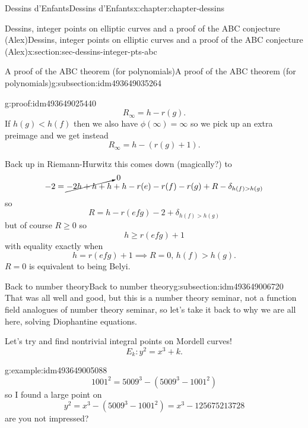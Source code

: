 \documentclass[oneside,10pt,]{book}
\numberwithin{equation}{section}
\newcommand{\lt}{<}
\newcommand{\gt}{>}
\begin{document}
\begin{chapterptx}{Dessins d'Enfants}{}{Dessins d'Enfants}{}{}{x:chapter:chapter-dessins}
\begin{sectionptx}{Dessins, integer points on elliptic curves and a proof of the ABC conjecture (Alex)}{}{Dessins, integer points on elliptic curves and a proof of the ABC conjecture (Alex)}{}{}{x:section:sec-dessins-integer-pts-abc}
\begin{subsectionptx}{A proof of the ABC theorem (for polynomials)}{}{A proof of the ABC theorem (for polynomials)}{}{}{g:subsection:idm493649035264}
\begin{proofptx}{}{g:proof:idm493649025440}
\begin{equation*}
R_\infty = h - r(g)\text{.}
\end{equation*}
If \(h(g) \lt h(f)\) then we also have \(\phi(\infty) = \infty\) so we pick up an extra preimage and we get instead%
\begin{equation*}
R_\infty = h - (r(g) + 1)\text{.}
\end{equation*}
%
\par
Back up in Riemann-Hurwitz this comes down (magically?) to%
\begin{equation*}
-2 = \cancelto{0}{-2 h + h + h} + h - r(e) -r(f) - r(g) + R - \delta_{h(f) \gt h(g)}
\end{equation*}
so%
\begin{equation*}
R = h - r(efg) - 2 + \delta_{h(f) \gt h(g)}
\end{equation*}
but of course \(R \ge 0\) so%
\begin{equation*}
h \ge r(efg) + 1
\end{equation*}
with equality exactly when%
\begin{equation*}
h = r(efg) + 1 \implies R = 0,\, h(f) \gt h(g)\text{.}
\end{equation*}
\(R= 0\) is equivalent to being Belyi.%
\end{proofptx}
\end{subsectionptx}
%
%
\typeout{************************************************}
\typeout{************************************************}
%
\begin{subsectionptx}{Back to number theory}{}{Back to number theory}{}{}{g:subsection:idm493649006720}
That was all well and good, but this is a number theory seminar, not a function field analogues of number theory seminar, so let's take it back to why we are all here, solving Diophantine equations.%
\par
Let's try and find nontrivial integral points on Mordell curves!%
\begin{equation*}
E_k\colon y^2 = x^3 + k\text{.}
\end{equation*}
%
\begin{example}{}{g:example:idm493649005088}%
%
\begin{equation*}
1001^2 = 5009^3 - (5009^3 - 1001^2)
\end{equation*}
so I found a large point on%
\begin{equation*}
y^2 = x^3 - (5009^3 - 1001^2) = x^3 - 125675213728
\end{equation*}
are you not impressed?%
\end{example}

\end{subsectionptx}
\end{sectionptx}
\end{chapterptx}
\end{document}
